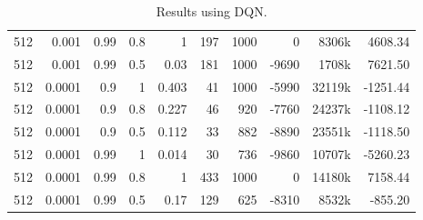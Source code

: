 \begin{table}
\begin{tabular}{r r r r | r r r r r r}
			512 & 0.001 & 0.99 & 0.8 & 1 & 197 & 1000 & 0 & 8306k & 4608.34 \\
			512 & 0.001 & 0.99 & 0.5 & 0.03 & 181 & 1000 & -9690 & 1708k & 7621.50 \\
			512 & 0.0001 & 0.9 & 1 & 0.403 & 41 & 1000 & -5990 & 32119k & -1251.44 \\
			512 & 0.0001 & 0.9 & 0.8 & 0.227 & 46 & 920 & -7760 & 24237k & -1108.12 \\
			512 & 0.0001 & 0.9 & 0.5 & 0.112 & 33 & 882 & -8890 & 23551k & -1118.50 \\
			512 & 0.0001 & 0.99 & 1 & 0.014 & 30 & 736 & -9860 & 10707k & -5260.23 \\
			512 & 0.0001 & 0.99 & 0.8 & 1 & 433 & 1000 & 0 & 14180k & 7158.44 \\
			512 & 0.0001 & 0.99 & 0.5 & 0.17 & 129 & 625 & -8310 & 8532k & -855.20 \\
		\bottomrule
	\end{tabular}
	\caption{Results using DQN.}
	\label{dqn_results}
\end{table}

